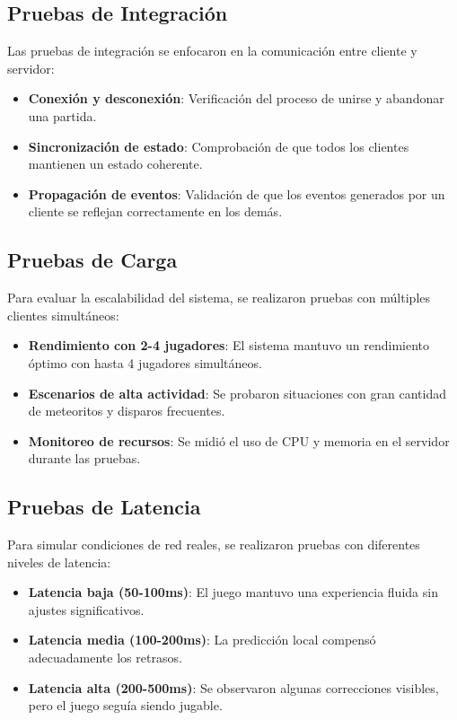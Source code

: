 \documentclass[12pt,letterpaper]{article}
\begin{document}
\subsection{Pruebas de Integración}

Las pruebas de integración se enfocaron en la comunicación entre cliente y servidor:

\begin{itemize}
    \item \textbf{Conexión y desconexión}: Verificación del proceso de unirse y abandonar una partida.
    \item \textbf{Sincronización de estado}: Comprobación de que todos los clientes mantienen un estado coherente.
    \item \textbf{Propagación de eventos}: Validación de que los eventos generados por un cliente se reflejan correctamente en los demás.
\end{itemize}

\subsection{Pruebas de Carga}

Para evaluar la escalabilidad del sistema, se realizaron pruebas con múltiples clientes simultáneos:

\begin{itemize}
    \item \textbf{Rendimiento con 2-4 jugadores}: El sistema mantuvo un rendimiento óptimo con hasta 4 jugadores simultáneos.
    \item \textbf{Escenarios de alta actividad}: Se probaron situaciones con gran cantidad de meteoritos y disparos frecuentes.
    \item \textbf{Monitoreo de recursos}: Se midió el uso de CPU y memoria en el servidor durante las pruebas.
\end{itemize}

\subsection{Pruebas de Latencia}

Para simular condiciones de red reales, se realizaron pruebas con diferentes niveles de latencia:

\begin{itemize}
    \item \textbf{Latencia baja (50-100ms)}: El juego mantuvo una experiencia fluida sin ajustes significativos.
    \item \textbf{Latencia media (100-200ms)}: La predicción local compensó adecuadamente los retrasos.
    \item \textbf{Latencia alta (200-500ms)}: Se observaron algunas correcciones visibles, pero el juego seguía siendo jugable.
\end{itemize}
\end{document}
